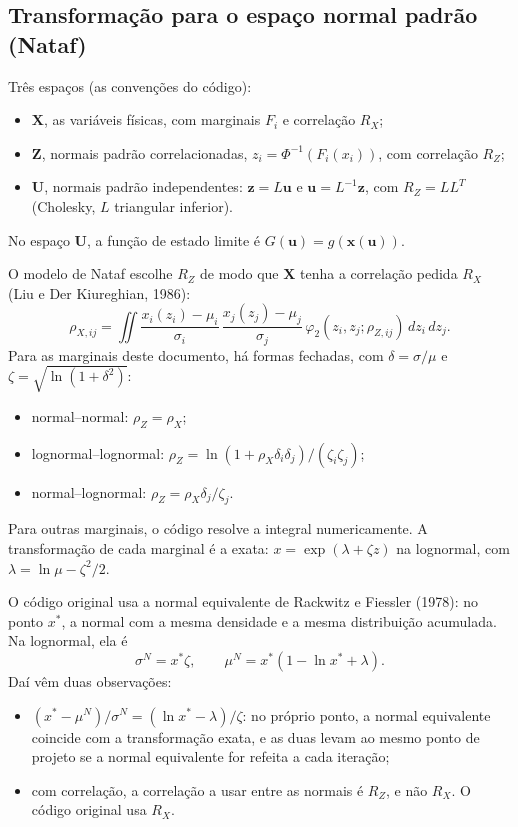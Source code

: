 \documentclass[11pt,a4paper]{article}
\begin{document}
\subsection{Transformação para o espaço normal padrão (Nataf)}
\label{sec:nataf}
Três espaços (as convenções do código):
\begin{itemize}
  \item $\bm X$, as variáveis físicas, com marginais $F_i$ e correlação $R_X$;
  \item $\bm Z$, normais padrão correlacionadas, $z_i = \Phi^{-1}(F_i(x_i))$, com correlação $R_Z$;
  \item $\bm U$, normais padrão independentes: $\bm z = L \bm u$ e $\bm u = L^{-1} \bm z$, com $R_Z = L L^T$ (Cholesky,
    $L$ triangular inferior).
\end{itemize}
No espaço $\bm U$, a função de estado limite é $G(\bm u) = g(\bm x(\bm u))$.

O modelo de Nataf escolhe $R_Z$ de modo que $\bm X$ tenha a correlação pedida $R_X$ (Liu e Der Kiureghian, 1986):
\begin{equation}
  \rho_{X,ij} = \iint \frac{x_i(z_i) - \mu_i}{\sigma_i}\, \frac{x_j(z_j) - \mu_j}{\sigma_j}\,
  \varphi_2(z_i, z_j; \rho_{Z,ij})\, dz_i\, dz_j .
\end{equation}
Para as marginais deste documento, há formas fechadas, com $\delta = \sigma/\mu$ e $\zeta = \sqrt{\ln(1 + \delta^2)}$:
\begin{itemize}
  \item normal--normal: $\rho_Z = \rho_X$;
  \item lognormal--lognormal: $\rho_Z = \ln(1 + \rho_X \delta_i \delta_j)/(\zeta_i \zeta_j)$;
  \item normal--lognormal: $\rho_Z = \rho_X \delta_j/\zeta_j$.
\end{itemize}
Para outras marginais, o código resolve a integral numericamente. A transformação de cada marginal é a exata:
$x = \exp(\lambda + \zeta z)$ na lognormal, com $\lambda = \ln \mu - \zeta^2/2$.

O código original usa a normal equivalente de Rackwitz e Fiessler (1978): no ponto $x^*$, a normal com a mesma
densidade e a mesma distribuição acumulada. Na lognormal, ela é
\[
  \sigma^N = x^* \zeta, \qquad \mu^N = x^*(1 - \ln x^* + \lambda).
\]
Daí vêm duas observações:
\begin{itemize}
  \item $(x^* - \mu^N)/\sigma^N = (\ln x^* - \lambda)/\zeta$: no próprio ponto, a normal equivalente coincide com a
    transformação exata, e as duas levam ao mesmo ponto de projeto se a normal equivalente for refeita a cada
    iteração;
  \item com correlação, a correlação a usar entre as normais é $R_Z$, e não $R_X$. O código original usa $R_X$.
\end{itemize}
\end{document}
